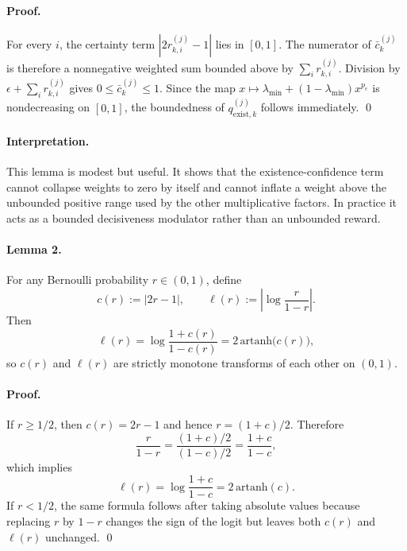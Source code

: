 \paragraph{Proof.}
For every $i$, the certainty term $|2r_{k,i}^{(j)} - 1|$ lies in $[0,1]$. The numerator of $\bar c_k^{(j)}$ is therefore a nonnegative weighted sum bounded above by $\sum_i r_{k,i}^{(j)}$. Division by $\epsilon + \sum_i r_{k,i}^{(j)}$ gives $0 \le \bar c_k^{(j)} \le 1$. Since the map $x \mapsto \lambda_{\min} + (1-\lambda_{\min})x^{p_e}$ is nondecreasing on $[0,1]$, the boundedness of $q_{\mathrm{exist},k}^{(j)}$ follows immediately. \qed

\paragraph{Interpretation.}
This lemma is modest but useful. It shows that the existence-confidence term cannot collapse weights to zero by itself and cannot inflate a weight above the unbounded positive range used by the other multiplicative factors. In practice it acts as a bounded decisiveness modulator rather than an unbounded reward.

\paragraph{Lemma 2.}
For any Bernoulli probability $r \in (0,1)$, define
\begin{equation}
c(r) := |2r-1|,
\qquad
\ell(r) := \left|\log \frac{r}{1-r}\right|.
\end{equation}
Then
\begin{equation}
\ell(r) = \log \frac{1+c(r)}{1-c(r)} = 2\,\mathrm{artanh}\!\big(c(r)\big),
\end{equation}
so $c(r)$ and $\ell(r)$ are strictly monotone transforms of each other on $(0,1)$.

\paragraph{Proof.}
If $r \ge 1/2$, then $c(r)=2r-1$ and hence $r=(1+c)/2$. Therefore
\begin{equation}
\frac{r}{1-r} = \frac{(1+c)/2}{(1-c)/2} = \frac{1+c}{1-c},
\end{equation}
which implies
\begin{equation}
\ell(r)=\log\frac{1+c}{1-c}=2\,\mathrm{artanh}(c).
\end{equation}
If $r<1/2$, the same formula follows after taking absolute values because replacing $r$ by $1-r$ changes the sign of the logit but leaves both $c(r)$ and $\ell(r)$ unchanged. \qed

